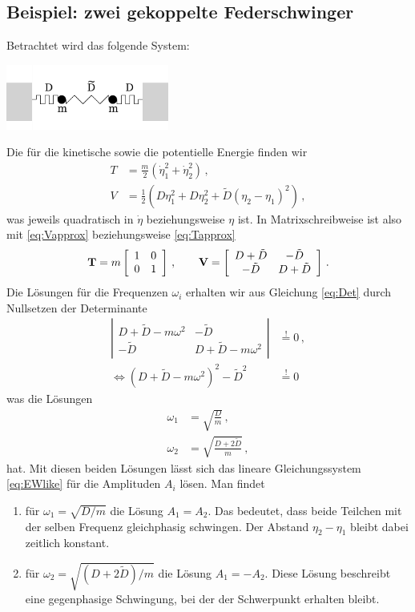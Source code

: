 \documentclass[paper=a4, fontsize=11.0pt, abstractoff, DIV12]{scrartcl}
\begin{document}
\subsection*{Beispiel: zwei gekoppelte Federschwinger}

Betrachtet wird das folgende System:
\begin{center}
    \includegraphics[width=0.4\textwidth]{Federschwinger}
\end{center}

Die für die kinetische sowie die potentielle Energie finden wir
\begin{align}
T &= \frac{m}{2}\left(\dot\eta_1^2 +\dot\eta_2^2 \right)\, ,\\
V &= \frac{1}{2}\left(D\eta_1^2 + D\eta_2^2 + \tilde D (\eta_2 - \eta_1)^2\right)\, ,
\end{align}
was jeweils quadratisch in $\dot\eta$ beziehungsweise $\eta$ ist. In
Matrixschreibweise ist also mit \eqref{eq:Vapprox} beziehungsweise
\eqref{eq:Tapprox}
\begin{equation}
\mathbf{T} = m\left[ \begin{array}{cc} 1 & 0 \\ 0 & 1 \end{array} \right]\,,\qquad
\mathbf{V} = \left[ \begin{array}{cc} D + \tilde{D} & -\tilde{D} \\ -\tilde{D} & D + \tilde{D} \end{array} \right]\,.
\end{equation}
Die Lösungen für die Frequenzen $\omega_i$ erhalten wir aus Gleichung
\eqref{eq:Det} durch Nullsetzen der Determinante
\begin{align}
\left| \begin{array}{cc} D + \tilde D - m\omega^2& - \tilde D\\-\tilde D & D + \tilde D - m\omega^2\end{array} \right| &\stackrel{!}{=} 0 \, ,\nonumber\\
\Leftrightarrow	\left( D + \tilde D - m\omega^2\right)^2 - \tilde{D}^2 &\stackrel{!}{=} 0
\end{align}
was die Lösungen
\begin{align}
\omega_1 &= \sqrt{\frac{D}{m}}\,,\nonumber\\
\omega_2 &= \sqrt{\frac{D+2\tilde{D}}{m}}\,,\nonumber
\end{align}
hat. Mit diesen beiden Lösungen lässt sich das lineare Gleichungssystem
\eqref{eq:EWlike} für die Amplituden $A_i$ lösen. Man findet
\begin{enumerate}
    \item für $\omega_1 = \sqrt{D/m}$ die Lösung $A_1 = A_2$. Das bedeutet,
    dass beide Teilchen mit der selben Frequenz gleichphasig
    schwingen. Der Abstand $\eta_2 - \eta_1$ bleibt dabei zeitlich konstant.
    \item für $\omega_2 = \sqrt{(D+2\tilde D)/m}$ die Lösung $A_1 = -A_2$.
    Diese Lösung beschreibt eine gegenphasige Schwingung, bei der der Schwerpunkt
    erhalten bleibt.
\end{enumerate}
\end{document}
